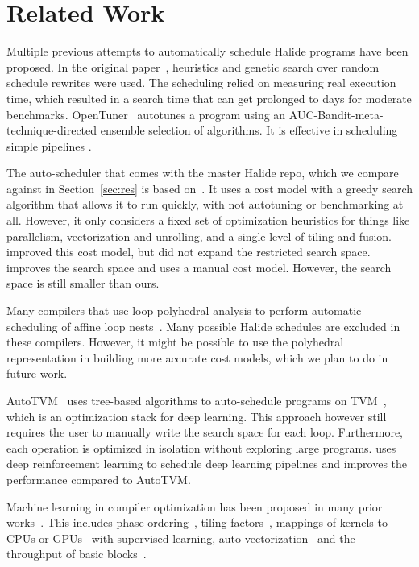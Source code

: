 \section{Related Work}
Multiple previous attempts to automatically schedule Halide programs have been proposed. In the original paper~\cite{ragan2013halide}, heuristics and genetic search over random schedule rewrites were used. The scheduling relied on measuring real execution time, which resulted in a search time that can get prolonged to days for moderate benchmarks. OpenTuner~\cite{ansel2014opentuner} autotunes a program using an AUC-Bandit-meta-technique-directed ensemble selection of algorithms. It is effective in scheduling simple pipelines \cite{mullapudi2015polymage}.

The auto-scheduler that comes with the master Halide repo, which we compare against in Section~\ref{sec:res} is based on~\cite{mullapudi2016automatically}. It uses a cost model with a greedy search algorithm that allows it to run quickly, with not autotuning or benchmarking at all. However, it only considers a fixed set of optimization heuristics for things like parallelism, vectorization and unrolling, and a single level of tiling and fusion. \cite{jangda2018effective} improved this cost model, but did not expand the restricted search space. \cite{sioutas2018loop,sioutas2019schedule} improves the search space and uses a manual cost model. However, the search space is still smaller than ours. 

Many compilers that use loop polyhedral analysis to perform automatic scheduling of affine loop nests~\cite{mullapudi2015polymage,vasilache2018tensor,baghdadi2015pencil,bondhugula2008practical,grosser2012polly,baghdadi2019tiramisu}. Many possible Halide schedules are excluded in these compilers. However, it might be possible to use the polyhedral representation in building more accurate cost models, which we plan to do in future work.

AutoTVM~\cite{chen2018learning} uses tree-based algorithms to auto-schedule programs on TVM~\cite{chen2018tvm}, which is an optimization stack for deep learning. This approach however still requires the user to manually write the search space for each loop. Furthermore, each operation is optimized in isolation without exploring large programs. \cite{ahn2019reinforcement} uses deep reinforcement learning to schedule deep learning pipelines and improves the performance compared to AutoTVM.

Machine learning in compiler optimization has been proposed in many prior works~\cite{wang2018machine,ashouri2018survey}. This includes phase ordering~\cite{fursin2008milepost,huang2013effect,huang2015effect,agakov2006using,2003Stephenson,2012Kulkarni}, tiling factors~\cite{rahman2010neural}, mappings of kernels to CPUs or GPUs~\cite{cummins2017end} with supervised learning, auto-vectorization~\cite{haj2020neurovectorizer,stock2012using,tian2016llvm,trifunovic2009polyhedral,nuzman2011vapor,porpodas2015throttling,larsen2000exploiting,mcfarlin2011automatic,porpodas2017supergraph,porpodas2015pslp,mendis2019compiler} and the throughput of basic blocks~\cite{mendis2018ithemal}.

